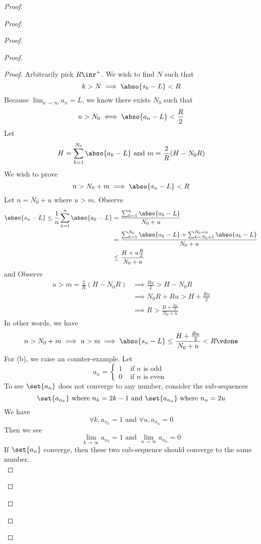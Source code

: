 \documentclass{report}
\begin{document}
\begin{proof}
\begin{proof}
\begin{proof}
\begin{proof}
\begin{proof}
Arbitrarily pick $R\inr^+$. We wish to find $N$ such that 
 \begin{equation*}
k>N\implies \abso{s_k-L}<R
\end{equation*}
Because $\lim_{n\to\infty}a_n=L$, we know there exists $N_0$ such that 
 \begin{equation*}
n>N_0\iff \abso{a_n-L}<\frac{R}{2}
\end{equation*}
Let
\begin{equation*}
H=\sum_{k=1}^{N_0} \abso{a_k-L}\text{ and }m=\frac{2}{R}(H-N_0R)
\end{equation*}
We wish to prove
\begin{equation*}
n>N_0+m \implies \abso{s_n-L}<R
\end{equation*}
Let $n=N_0+u$ where $u>m$. Observe
\begin{align*}
  \abso{s_n-L}\leq \frac{1}{n}\sum_{k=1}^n \abso{a_k-L}&=\frac{\sum_{k=1}^n \abso{a_k-L}}{N_0+u}\\
  &= \frac{\sum_{k=1}^{N_0} \abso{a_k-L}+\sum_{k=N_0+1}^{N_0+u} \abso{a_k-L}}{N_0+u}\\
  &\leq \frac{H+u \frac{R}{2}}{N_0+u}
\end{align*}
and Observe 
\begin{align*}
  u>m=\frac{2}{R}(H-N_0R)&\implies \frac{Ru}{2}>H-N_0R\\
                         &\implies N_0R+ Ru>H+ \frac{Ru}{2}\\
&\implies R>\frac{H+\frac{Ru}{2}}{N_0+u}
\end{align*}
In other words, we have
\begin{equation*}
n>N_0+m \implies u>m\implies \abso{s_n-L}\leq \frac{H+\frac{Ru}{2}}{N_0+u}<R\vdone
\end{equation*}
For (b), we raise an counter-example. Let
\begin{equation*}
a_n=\begin{cases}
  1& \text{ if $n$ is odd }\\
  0& \text{ if $n$ is even }
\end{cases}
\end{equation*}
To see $\set{a_n}$ does not converge to any number, consider the sub-sequences
\begin{equation*}
\set{a_{n_k}}\text{ where }n_k=2k-1\text{ and }\set{a_{n_u}}\text{ where }n_u=2u
\end{equation*}
We have
\begin{equation*}
\forall k,a_{n_k}=1\text{ and }\forall u,a_{n_u}=0
\end{equation*}
Then we see 
\begin{equation*}
\lim_{k\to\infty}a_{n_k}=1\text{ and }\lim_{u\to\infty}a_{n_u}=0
\end{equation*}
If $\set{a_n}$ converge, then these two sub-sequence should converge to the same number.\\


\end{proof}
\end{proof}
\end{proof}
\end{proof}
\end{proof}
\end{document}
